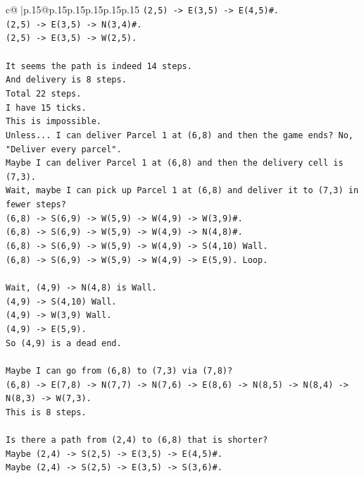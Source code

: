 \documentclass{article}
\begin{document}
{\begin{supertabular}{c@{$\;$}|p{.15\linewidth}@{}p{.15\linewidth}p{.15\linewidth}p{.15\linewidth}p{.15\linewidth}p{.15\linewidth}}
{{{\texttt{(2,5) {-}> E(3,5) {-}> E(4,5)\#.} \\
\texttt{(2,5) {-}> E(3,5) {-}> N(3,4)\#.} \\
\texttt{(2,5) {-}> E(3,5) {-}> W(2,5).} \\
\\ 
\texttt{It seems the path is indeed 14 steps.} \\
\texttt{And delivery is 8 steps.} \\
\texttt{Total 22 steps.} \\
\texttt{I have 15 ticks.} \\
\texttt{This is impossible.} \\
\texttt{Unless... I can deliver Parcel 1 at (6,8) and then the game ends? No, "Deliver every parcel".} \\
\texttt{Maybe I can deliver Parcel 1 at (6,8) and then the delivery cell is (7,3).} \\
\texttt{Wait, maybe I can pick up Parcel 1 at (6,8) and deliver it to (7,3) in fewer steps?} \\
\texttt{(6,8) {-}> S(6,9) {-}> W(5,9) {-}> W(4,9) {-}> W(3,9)\#.} \\
\texttt{(6,8) {-}> S(6,9) {-}> W(5,9) {-}> W(4,9) {-}> N(4,8)\#.} \\
\texttt{(6,8) {-}> S(6,9) {-}> W(5,9) {-}> W(4,9) {-}> S(4,10) Wall.} \\
\texttt{(6,8) {-}> S(6,9) {-}> W(5,9) {-}> W(4,9) {-}> E(5,9). Loop.} \\
\\ 
\texttt{Wait, (4,9) {-}> N(4,8) is Wall.} \\
\texttt{(4,9) {-}> S(4,10) Wall.} \\
\texttt{(4,9) {-}> W(3,9) Wall.} \\
\texttt{(4,9) {-}> E(5,9).} \\
\texttt{So (4,9) is a dead end.} \\
\\ 
\texttt{Maybe I can go from (6,8) to (7,3) via (7,8)?} \\
\texttt{(6,8) {-}> E(7,8) {-}> N(7,7) {-}> N(7,6) {-}> E(8,6) {-}> N(8,5) {-}> N(8,4) {-}> N(8,3) {-}> W(7,3).} \\
\texttt{This is 8 steps.} \\
\\ 
\texttt{Is there a path from (2,4) to (6,8) that is shorter?} \\
\texttt{Maybe (2,4) {-}> S(2,5) {-}> E(3,5) {-}> E(4,5)\#.} \\
\texttt{Maybe (2,4) {-}> S(2,5) {-}> E(3,5) {-}> S(3,6)\#.} \\
}}}
\end{supertabular}}
\end{document}
